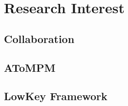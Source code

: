 
%

\chapter{Research Interest}
\label{cha:research_interest}

\section{Collaboration}

\section{AToMPM}

\section{LowKey Framework}